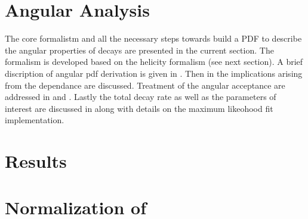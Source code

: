 

\section{Angular Analysis}
\label{Angular_Analysis}
 
The core formalistm and all the necessary steps towards build a PDF to describe the angular properties of \BJpsiKst decays are presented in
the current section. The formalism is developed based on the helicity formalism (see next section). A brief discription of 
angular pdf derivation is given in . Then in  the implications arising from the
\mkpi dependance are discussed. Treatment of the angular acceptance are addressed in  and .
Lastly the total decay rate as well as the \ACP parameters of interest are discussed in  along with details
on the maximum likeohood fit implementation.



\section{Results}
\label{Results}


\section{Normalization of \BsJpsiKpi}
\label{Normalization}
